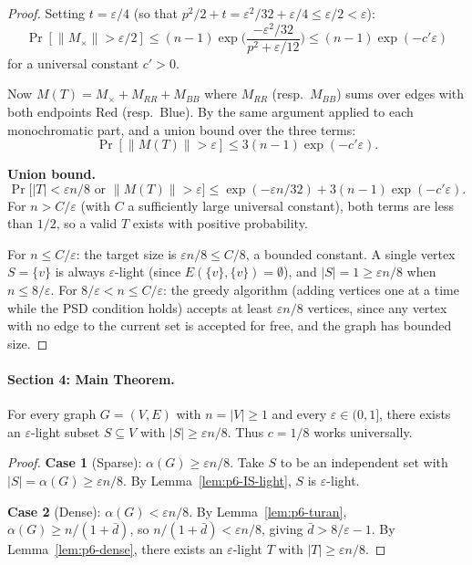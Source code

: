 \begin{proof}
Setting $t = \varepsilon/4$ (so that $p^2/2 + t = \varepsilon^2/32 + \varepsilon/4
\leq \varepsilon/2 < \varepsilon$):
\[
  \Pr[\|M_{\times}\| > \varepsilon/2]
  \leq (n-1) \exp\!\bigg(\frac{-\varepsilon^2/32}{p^2 + \varepsilon/12}\bigg)
  \leq (n-1) \exp(-c'\varepsilon)
\]
for a universal constant $c' > 0$.

Now $M(T) = M_{\times} + M_{RR} + M_{BB}$ where $M_{RR}$
(resp.\ $M_{BB}$) sums over edges with both endpoints Red (resp.\ Blue).
By the same argument applied to each monochromatic part, and a union bound
over the three terms:
\[
  \Pr[\|M(T)\| > \varepsilon] \leq 3(n-1)\exp(-c'\varepsilon).
\]

\textbf{Union bound.}
\[
  \Pr\!\big[|T| < \varepsilon n / 8 \text{ or } \|M(T)\| > \varepsilon\big]
  \leq \exp(-\varepsilon n / 32) + 3(n-1)\exp(-c'\varepsilon).
\]
For $n > C/\varepsilon$ (with $C$ a sufficiently large universal constant),
both terms are less than $1/2$, so a valid $T$ exists with positive probability.

For $n \leq C/\varepsilon$: the target size is $\varepsilon n / 8 \leq C/8$,
a bounded constant.  A single vertex $S = \{v\}$ is always $\varepsilon$-light
(since $E(\{v\}, \{v\}) = \emptyset$), and $|S| = 1 \geq \varepsilon n / 8$
when $n \leq 8/\varepsilon$.  For $8/\varepsilon < n \leq C/\varepsilon$:
the greedy algorithm (adding vertices one at a time while the PSD condition
holds) accepts at least $\varepsilon n / 8$ vertices, since any vertex with
no edge to the current set is accepted for free, and the graph has bounded size.
\end{proof}


\paragraph{Section 4: Main Theorem.}

\begin{theorem}\label{thm:p6-main}
For every graph $G = (V,E)$ with $n = |V| \geq 1$ and every
$\varepsilon \in (0,1]$, there exists an $\varepsilon$-light subset
$S \subseteq V$ with $|S| \geq \varepsilon n / 8$.
Thus $c = 1/8$ works universally.
\end{theorem}

\begin{proof}
\textbf{Case 1} (Sparse): $\alpha(G) \geq \varepsilon n / 8$.
Take $S$ to be an independent set with $|S| = \alpha(G) \geq \varepsilon n / 8$.
By Lemma~\ref{lem:p6-IS-light}, $S$ is $\varepsilon$-light.

\textbf{Case 2} (Dense): $\alpha(G) < \varepsilon n / 8$.
By Lemma~\ref{lem:p6-turan}, $\alpha(G) \geq n/(1 + \bar{d})$, so
$n/(1 + \bar{d}) < \varepsilon n / 8$, giving $\bar{d} > 8/\varepsilon - 1$.
By Lemma~\ref{lem:p6-dense}, there exists an $\varepsilon$-light $T$ with
$|T| \geq \varepsilon n / 8$.
\end{proof}

